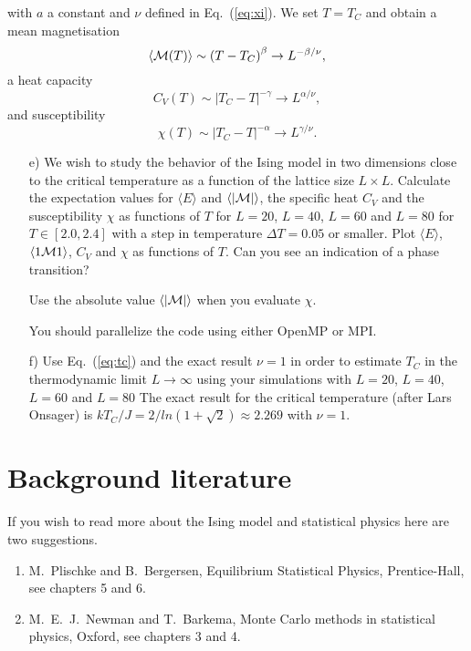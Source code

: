 \documentclass[11pt,a4wide]{article}
\begin{document}
with  $a$ a constant and  $\nu$ defined in Eq.~(\ref{eq:xi}).
We set $T=T_C$ and obtain a mean magnetisation
\begin{equation}
  \langle {\cal M}(T) \rangle \sim \left(T-T_C\right)^{\beta}
  \rightarrow L^{-\beta/\nu},
  \label{eq:scale1}
\end{equation}
a heat capacity
\begin{equation}
  C_V(T) \sim \left|T_C-T\right|^{-\gamma} \rightarrow L^{\alpha/\nu},
  \label{eq:scale2}
\end{equation}
and susceptibility
\begin{equation}
  \chi(T) \sim \left|T_C-T\right|^{-\alpha} \rightarrow L^{\gamma/\nu}.
  \label{eq:scale3}
\end{equation}

\begin{enumerate}
\item [e)]  We wish to study the behavior of the Ising model in two dimensions close to the 
critical temperature as a function of the lattice size $L\times L$.
Calculate the expectation values 
for $\langle E\rangle$ and $\langle |{\cal M}|\rangle$,
the specific heat $C_V$ and the susceptibility $\chi$
as functions  of $T$ for $L=20$, $L=40$, $L=60$ and $L=80$ for $T\in [2.0,2.4]$
with a step in temperature $\Delta T=0.05$ or smaller. 
Plot  $\langle E\rangle$, $\langle 1{\cal M}1\rangle$, $C_V$ and $\chi$ 
as functions of $T$. Can you see an indication of a phase transition?

Use the absolute value $\langle |{\cal M}|\rangle$ when you evaluate $\chi$.

You should parallelize the code using either OpenMP or MPI.
\item[f)]  Use Eq.~(\ref{eq:tc}) and the exact result
$\nu=1$ in order to estimate $T_C$ in the thermodynamic limit $L\rightarrow \infty$
using your simulations with $L=20$, $L=40$, $L=60$ and $L=80$
The exact result for the critical temperature (after Lars Onsager) is
$kT_C/J=2/ln(1+\sqrt{2})\approx 2.269$ with $\nu=1$.
\end{enumerate}

\section*{Background literature}
If you wish to read more about the Ising model and statistical physics here are two suggestions.
\begin{enumerate}
\item M.~Plischke and B.~Bergersen, Equilibrium Statistical Physics,
Prentice-Hall, see chapters 5 and 6.
\item M.~E.~J.~Newman and T.~Barkema, Monte Carlo methods in statistical physics, Oxford, see chapters 3 and 4.

\end{enumerate}
\end{document}
